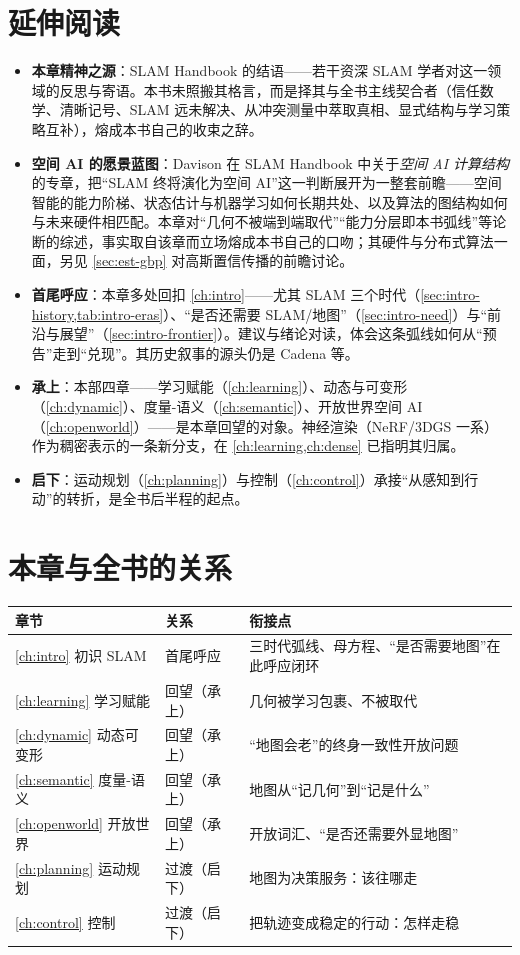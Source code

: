 \section*{延伸阅读}
\begin{itemize}
  \item \textbf{本章精神之源}：SLAM Handbook\cite{carlone2026handbook} 的结语——若干资深 SLAM 学者对这一领域的反思与寄语。本书未照搬其格言，而是择其与全书主线契合者（信任数学、清晰记号、SLAM 远未解决、从冲突测量中萃取真相、显式结构与学习策略互补），熔成本书自己的收束之辞。
  \item \textbf{空间 AI 的愿景蓝图}：Davison 在 SLAM Handbook 中关于\emph{空间 AI 计算结构}的专章\cite{davison2026computational}，把“SLAM 终将演化为空间 AI”这一判断展开为一整套前瞻——空间智能的能力阶梯、状态估计与机器学习如何长期共处、以及算法的图结构如何与未来硬件相匹配。本章对“几何不被端到端取代”“能力分层即本书弧线”等论断的综述，事实取自该章而立场熔成本书自己的口吻；其硬件与分布式算法一面，另见 \cref{sec:est-gbp} 对高斯置信传播的前瞻讨论。
  \item \textbf{首尾呼应}：本章多处回扣 \cref{ch:intro}——尤其 SLAM 三个时代（\cref{sec:intro-history,tab:intro-eras}）、“是否还需要 SLAM/地图”（\cref{sec:intro-need}）与“前沿与展望”（\cref{sec:intro-frontier}）。建议与绪论对读，体会这条弧线如何从“预告”走到“兑现”。其历史叙事的源头仍是 Cadena 等\cite{cadena2016past}。
  \item \textbf{承上}：本部四章——学习赋能（\cref{ch:learning}）、动态与可变形（\cref{ch:dynamic}）、度量-语义（\cref{ch:semantic}）、开放世界空间 AI（\cref{ch:openworld}）——是本章回望的对象。神经渲染（NeRF/3DGS 一系）作为稠密表示的一条新分支，在 \cref{ch:learning,ch:dense} 已指明其归属。
  \item \textbf{启下}：运动规划（\cref{ch:planning}）与控制（\cref{ch:control}）承接“从感知到行动”的转折，是全书后半程的起点。
\end{itemize}

\section*{本章与全书的关系}
\begin{table}[H]\centering\small
\begin{tabular}{lll}
\toprule
章节 & 关系 & 衔接点 \\
\midrule
\cref{ch:intro} 初识 SLAM & 首尾呼应 & 三时代弧线、母方程、“是否需要地图”在此呼应闭环 \\
\cref{ch:learning} 学习赋能 & 回望（承上）& 几何被学习包裹、不被取代 \\
\cref{ch:dynamic} 动态可变形 & 回望（承上）& “地图会老”的终身一致性开放问题 \\
\cref{ch:semantic} 度量-语义 & 回望（承上）& 地图从“记几何”到“记是什么” \\
\cref{ch:openworld} 开放世界 & 回望（承上）& 开放词汇、“是否还需要外显地图” \\
\cref{ch:planning} 运动规划 & 过渡（启下）& 地图为决策服务：该往哪走 \\
\cref{ch:control} 控制 & 过渡（启下）& 把轨迹变成稳定的行动：怎样走稳 \\
\bottomrule
\end{tabular}
\end{table}
